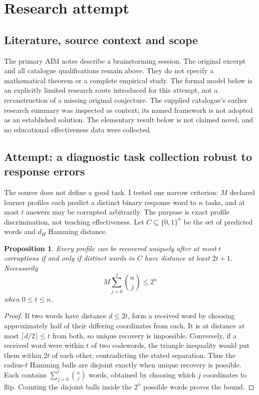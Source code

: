 \documentclass[11pt]{article}
\newtheorem{proposition}{Proposition}
\begin{document}
\section{Research attempt}
\subsection{Literature, source context and scope}
The primary AIM notes describe a brainstorming session. The original excerpt and all catalogue qualifications remain above. They do not specify a mathematical theorem or a complete empirical study. The formal model below is an explicitly limited research route introduced for this attempt, not a reconstruction of a missing original conjecture. The supplied catalogue's earlier research summary was inspected as context; its named framework is not adopted as an established solution. The elementary result below is not claimed novel, and no educational effectiveness data were collected.

\subsection{Attempt: a diagnostic task collection robust to response errors}
The source does not define a good task. I tested one narrow criterion: $M$ declared learner profiles each predict a distinct binary response word to $n$ tasks, and at most $t$ answers may be corrupted arbitrarily. The purpose is exact profile discrimination, not teaching effectiveness. Let $C\subseteq\{0,1\}^n$ be the set of predicted words and $d_H$ Hamming distance.
\begin{proposition}
Every profile can be recovered uniquely after at most $t$ corruptions if and only if distinct words in $C$ have distance at least $2t+1$. Necessarily
\[
M\sum_{j=0}^t\binom nj\le2^n
\]
when $0\le t\le n$.
\end{proposition}
\begin{proof}
If two words have distance $d\le2t$, form a received word by choosing approximately half of their differing coordinates from each. It is at distance at most $\lceil d/2\rceil\le t$ from both, so unique recovery is impossible. Conversely, if a received word were within $t$ of two codewords, the triangle inequality would put them within $2t$ of each other, contradicting the stated separation. Thus the radius-$t$ Hamming balls are disjoint exactly when unique recovery is possible. Each contains $\sum_{j=0}^t\binom nj$ words, obtained by choosing which $j$ coordinates to flip. Counting the disjoint balls inside the $2^n$ possible words proves the bound.
\end{proof}
\end{document}
